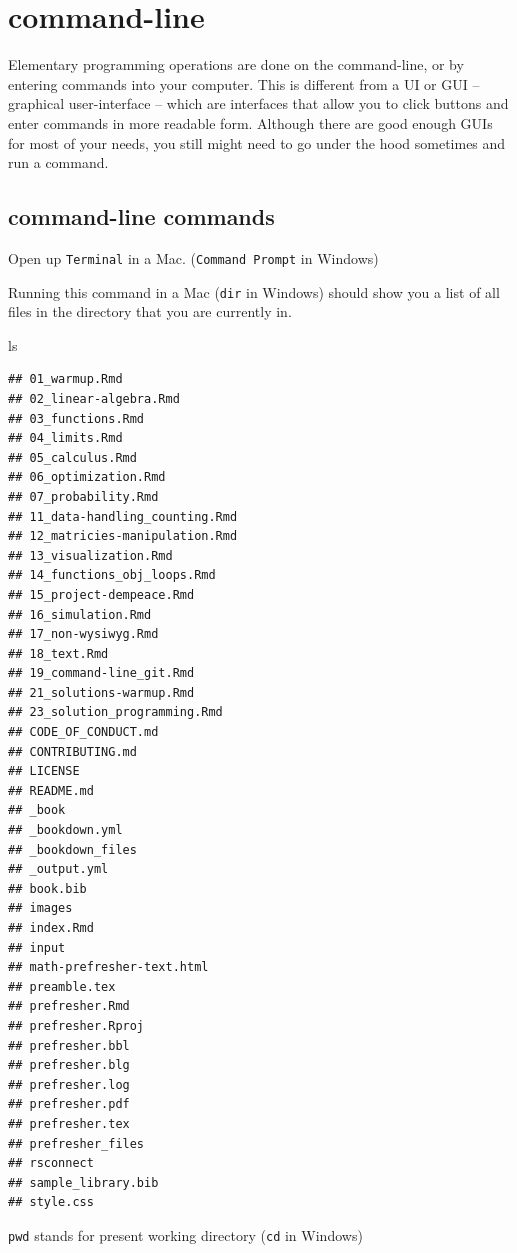 \documentclass[]{book}
\newenvironment{Shaded}{\begin{snugshade}}{\end{snugshade}}
\newcommand{\FunctionTok}[1]{\textcolor[rgb]{0.00,0.00,0.00}{#1}}
\theoremstyle{definition}
\theoremstyle{definition}
\theoremstyle{definition}
\theoremstyle{remark}
\begin{document}
\hypertarget{command-line}{%
\section{command-line}\label{command-line}}

Elementary programming operations are done on the command-line, or by entering commands into your computer. This is different from a UI or GUI -- graphical user-interface -- which are interfaces that allow you to click buttons and enter commands in more readable form. Although there are good enough GUIs for most of your needs, you still might need to go under the hood sometimes and run a command.

\hypertarget{command-line-commands}{%
\subsection{command-line commands}\label{command-line-commands}}

Open up \texttt{Terminal} in a Mac. (\texttt{Command\ Prompt} in Windows)

Running this command in a Mac (\texttt{dir} in Windows) should show you a list of all files in the directory that you are currently in.

\begin{Shaded}
\begin{Highlighting}[]
\FunctionTok{ls}
\end{Highlighting}
\end{Shaded}

\begin{verbatim}
## 01_warmup.Rmd
## 02_linear-algebra.Rmd
## 03_functions.Rmd
## 04_limits.Rmd
## 05_calculus.Rmd
## 06_optimization.Rmd
## 07_probability.Rmd
## 11_data-handling_counting.Rmd
## 12_matricies-manipulation.Rmd
## 13_visualization.Rmd
## 14_functions_obj_loops.Rmd
## 15_project-dempeace.Rmd
## 16_simulation.Rmd
## 17_non-wysiwyg.Rmd
## 18_text.Rmd
## 19_command-line_git.Rmd
## 21_solutions-warmup.Rmd
## 23_solution_programming.Rmd
## CODE_OF_CONDUCT.md
## CONTRIBUTING.md
## LICENSE
## README.md
## _book
## _bookdown.yml
## _bookdown_files
## _output.yml
## book.bib
## images
## index.Rmd
## input
## math-prefresher-text.html
## preamble.tex
## prefresher.Rmd
## prefresher.Rproj
## prefresher.bbl
## prefresher.blg
## prefresher.log
## prefresher.pdf
## prefresher.tex
## prefresher_files
## rsconnect
## sample_library.bib
## style.css
\end{verbatim}

\texttt{pwd} stands for present working directory (\texttt{cd} in Windows)
\end{document}
